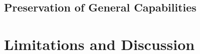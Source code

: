 \documentclass{article}
\begin{document}


%
%
\subsection{Preservation of General Capabilities}
\label{sec:analysis:forgetting}



\section{Limitations and Discussion}
\label{sec:limitations}
\end{document}
